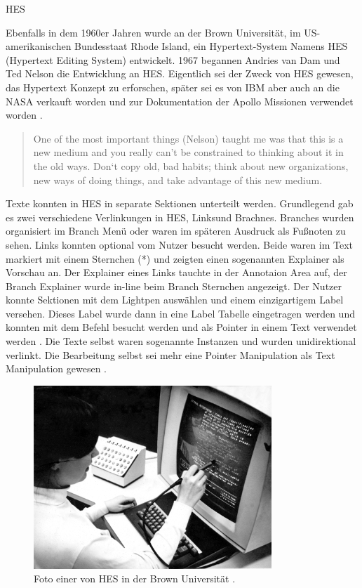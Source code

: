 \begin{section}{HES}
\label{sec:hes}

Ebenfalls in dem 1960er Jahren wurde an der Brown Universität, im US-amerikanischen Bundesstaat Rhode Island, ein Hypertext-System Namens \glqq HES\grqq{ } (Hypertext Editing System) entwickelt. 1967 begannen Andries van Dam und Ted Nelson die Entwicklung an HES. Eigentlich sei der Zweck von HES gewesen, das Hypertext Konzept zu erforschen, später sei es von IBM aber auch an die NASA verkauft worden und zur Dokumentation der Apollo Missionen verwendet worden \cite{Dam1988}.

\begin{quote}
\glqq One of the most important things (Nelson) taught me was that this is a new medium and you really can’t be constrained to thinking about it in the old ways. Don‘t copy old, bad habits; think about new organizations, new ways of doing things, and take advantage of this new medium.\grqq{ }\cite{Dam1988}
\end{quote}

Texte konnten in HES in separate Sektionen unterteilt werden. Grundlegend gab es zwei verschiedene Verlinkungen in HES, \glqq Links\grqq{ }und \glqq Brachnes\grqq{ }. Branches wurden organisiert im Branch Menü oder waren im späteren Ausdruck als Fußnoten zu sehen. Links konnten optional vom Nutzer besucht werden. Beide waren im Text markiert mit einem Sternchen (*) und zeigten einen sogenannten Explainer als Vorschau an. Der Explainer eines Links tauchte in der Annotaion Area auf, der Branch Explainer wurde in-line beim Branch Sternchen angezeigt. Der Nutzer konnte Sektionen mit dem Lightpen auswählen und einem einzigartigem Label versehen. Dieses Label wurde dann in eine Label Tabelle eingetragen werden und konnten mit dem Befehl besucht werden und als Pointer in einem Text verwendet werden \cite{Dam1969}. Die Texte selbst waren sogenannte Instanzen und wurden unidirektional verlinkt. Die Bearbeitung selbst sei mehr eine Pointer Manipulation als Text Manipulation gewesen \cite[S. 890]{Dam1988}.

\begin{figure}[H]
	\centering
	\includegraphics[width=0.8\textwidth]{image/hes}
	\caption{Foto einer von HES in der Brown Universität \cite{Lloyd1969}.}
	\label{fig:hes}
\end{figure}


\end{section}
